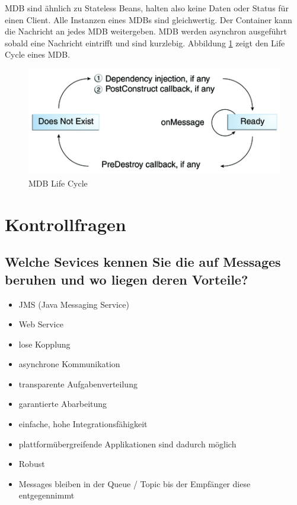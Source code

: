 MDB sind ähnlich zu Stateless Beans, halten also keine Daten oder Status für einen Client. Alle Instanzen eines MDBs sind gleichwertig. Der Container kann die Nachricht an jedes MDB weitergeben. MDB werden asynchron ausgeführt sobald eine Nachricht eintrifft und sind kurzlebig. Abbildung \ref{fig:mdb-lifecycle} zeigt den Life Cycle eines MDB.

\begin{figure}
\centering
\includegraphics[width=0.7\linewidth]{fig/mdb-lifecycle}
\caption{MDB Life Cycle}
\label{fig:mdb-lifecycle}
\end{figure}


\section{Kontrollfragen}

\subsection{Welche Sevices kennen Sie die auf Messages beruhen und wo liegen deren Vorteile?}

\begin{itemize}
	\item JMS (Java Messaging Service)
	\item Web Service
\end{itemize}

\begin{itemize}
	\item lose Kopplung
	\item asynchrone Kommunikation
	\item transparente Aufgabenverteilung
	\item garantierte Abarbeitung
	\item einfache, hohe Integrationsfähigkeit
	\item plattformübergreifende Applikationen sind dadurch möglich
	\item Robust
	\item Messages bleiben in der Queue / Topic bis der Empfänger diese entgegennimmt
\end{itemize}


